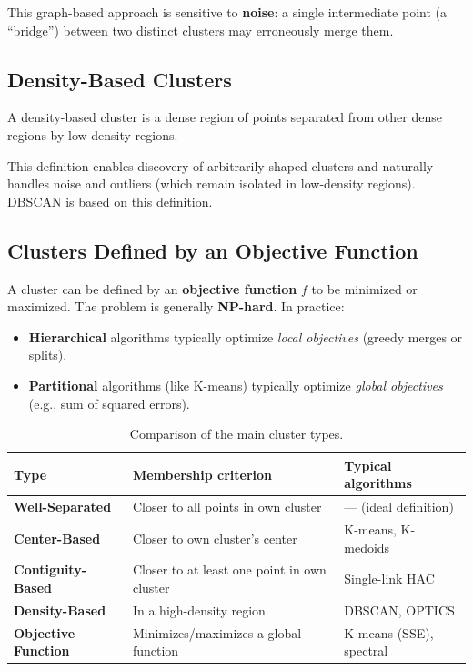 This graph-based approach is sensitive to \textbf{noise}: a single intermediate point (a ``bridge'') between two distinct clusters may erroneously merge them.

\subsection{Density-Based Clusters}

\begin{definition}
A density-based cluster is a dense region of points separated from other dense regions by low-density regions.
\end{definition}

This definition enables discovery of arbitrarily shaped clusters and naturally handles noise and outliers (which remain isolated in low-density regions). DBSCAN is based on this definition.

\subsection{Clusters Defined by an Objective Function}

A cluster can be defined by an \textbf{objective function} $f$ to be minimized or maximized. The problem is generally \textbf{NP-hard}. In practice:
\begin{itemize}
  \item \textbf{Hierarchical} algorithms typically optimize \textit{local objectives} (greedy merges or splits).
  \item \textbf{Partitional} algorithms (like K-means) typically optimize \textit{global objectives} (e.g., sum of squared errors).
\end{itemize}

\begin{table}[htbp]
\centering
\small
\begin{tabularx}{\textwidth}{>{\bfseries}p{3.2cm} >{\raggedright\arraybackslash}X >{\raggedright\arraybackslash}X}
\toprule
Type & Membership criterion & Typical algorithms \\
\midrule
Well-Separated & Closer to all points in own cluster & --- (ideal definition) \\
\addlinespace
Center-Based & Closer to own cluster's center & K-means, K-medoids \\
\addlinespace
Contiguity-Based & Closer to at least one point in own cluster & Single-link HAC \\
\addlinespace
Density-Based & In a high-density region & DBSCAN, OPTICS \\
\addlinespace
Objective Function & Minimizes/maximizes a global function & K-means (SSE), spectral \\
\bottomrule
\end{tabularx}
\caption{Comparison of the main cluster types.}
\label{tab:cluster-types}
\end{table}

